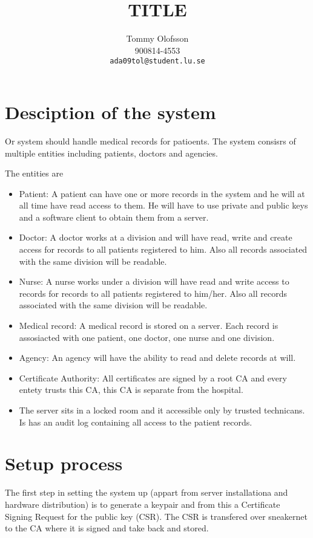 \documentclass[10pt, a4paper]{article}
\title{TITLE}
\date{}
\author{Tommy Olofsson\\
  900814-4553\\
  \texttt{ada09tol@student.lu.se}}
\begin{document}
\begin{titlepage}
\maketitle
\begin{center}
\end{center}

\thispagestyle{empty}
\end{titlepage}
\setcounter{page}{2}
\section{Desciption of the system}
Or system should handle medical records for patioents. The system consisrs of multiple entities including patients, doctors and agencies. 

The entities are
\begin{itemize}
\item Patient: A patient can have one or more records in the system and he will at all time have read access to them. He will have to use private and public keys and a software client to obtain them from a server. 
\item Doctor: A doctor works at a division and will have read, write and create access for records to all patients registered to him. Also all records associated with the same division will be readable.
\item Nurse: A nurse works under a division will have read and write access to records for records to all patients registered to him/her. Also all records associated with the same division will be readable.
\item Medical record: A medical record is stored on a server. Each record is assosiacted with one patient, one doctor, one nurse and one division.
\item Agency: An agency will have the ability to read and delete records at will.
\item Certificate Authority: All certificates are signed by a root CA and every entety trusts this CA, this CA is
separate from the hospital.
\item The server sits in a locked room and it accessible only by trusted technicans. Is has an audit log containing all access to the patient records.
\end{itemize}

\section{Setup process}
The first step in setting the system up (appart from server installationa and hardware distribution) is to generate a keypair and from this a Certificate Signing Request for the public key (CSR). The CSR is transfered over sneakernet to the CA where it is signed and take back and stored. 
\end{document}
